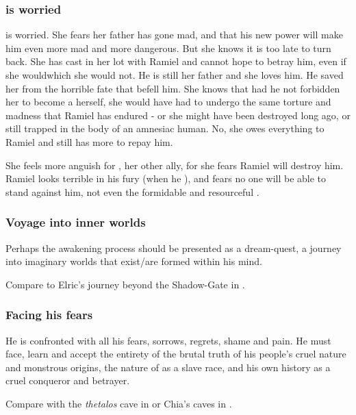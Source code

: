 \subsubsection{\Cishiel is worried}
\Cishiel is worried.
She fears her father has gone mad, and that his new power will make him even more mad and more dangerous.
But she knows it is too late to turn back.
She has cast in her lot with Ramiel and cannot hope to betray him, even if she would\prikker which she would not.
He is still her father and she loves him. 
He saved her from the horrible fate that befell him.
She knows that had he not forbidden her to become a \malach herself, she would have had to undergo the same torture and madness that Ramiel has endured - or she might have been destroyed long ago, or still trapped in the body of an amnesiac human.
No, she owes everything to Ramiel and still has more to repay him.

She feels more anguish for \Dasteron, her other ally, for she fears Ramiel will destroy him.
Ramiel looks terrible in his fury (when he ), and \Cishiel fears no one will be able to stand against him, not even the formidable and resourceful \Dasteron.





\subsubsection{Voyage into inner worlds}
Perhaps the awakening process should be presented as a dream-quest, a journey into imaginary worlds that exist/are formed within his mind. 

Compare to Elric's journey beyond the Shadow-Gate in \cite{MichaelMoorcock:ElricofMelnibone}. 





\subsubsection{Facing his fears}
He is confronted with all his fears, sorrows, regrets, shame and pain. He must face, learn and accept the entirety of the brutal truth of his people's cruel nature and monstrous origins, the nature of \humans{} as a slave race, and his own history as a cruel conqueror and betrayer. 

Compare with the \emph{thetalos} cave in  or Chia's caves in . 

